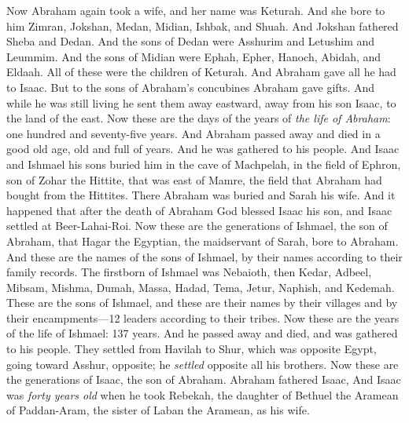 \begin{biblechapter} %
 Now Abraham again took a wife, and her name was Keturah.
\verse And she bore to him Zimran, Jokshan, Medan, Midian, Ishbak, and Shuah.
\verse And Jokshan fathered Sheba and Dedan. And the sons of Dedan were Asshurim and Letushim and Leummim.
\verse And the sons of Midian were Ephah, Epher, Hanoch, Abidah, and Eldaah. All of these were the children of Keturah.
\verse And Abraham gave all he had to Isaac.
\verse But to the sons of Abraham’s concubines Abraham gave gifts. And while he was still living he sent them away eastward, away from his son Isaac, to the land of the east.
\verse Now these are the days of the years of \textit{the life of Abraham}: one hundred and seventy-five years.
\verse And Abraham passed away and died in a good old age, old and full of years. And he was gathered to his people.
\verse And Isaac and Ishmael his sons buried him in the cave of Machpelah, in the field of Ephron, son of Zohar the Hittite, that was east of Mamre,
\verse the field that Abraham had bought from the Hittites. There Abraham was buried and Sarah his wife.
\verse And it happened that after the death of Abraham God blessed Isaac his son, and Isaac settled at Beer-Lahai-Roi.
\verse Now these are the generations of Ishmael, the son of Abraham, that Hagar the Egyptian, the maidservant of Sarah, bore to Abraham.
\verse And these are the names of the sons of Ishmael, by their names according to their family records. The firstborn of Ishmael was Nebaioth, then Kedar, Adbeel, Mibsam,
\verse Mishma, Dumah, Massa,
\verse Hadad, Tema, Jetur, Naphish, and Kedemah.
\verse These are the sons of Ishmael, and these are their names by their villages and by their encampments—12 leaders according to their tribes.
\verse Now these are the years of the life of Ishmael: 137 years. And he passed away and died, and was gathered to his people.
\verse They settled from Havilah to Shur, which was opposite Egypt, going toward Asshur, opposite; he \textit{settled} opposite all his brothers.
 Now these are the generations of Isaac, the son of Abraham. Abraham fathered Isaac,
\verse And Isaac was \textit{forty years old} when he took Rebekah, the daughter of Bethuel the Aramean of Paddan-Aram, the sister of Laban the Aramean, as his wife.

\end{biblechapter}

